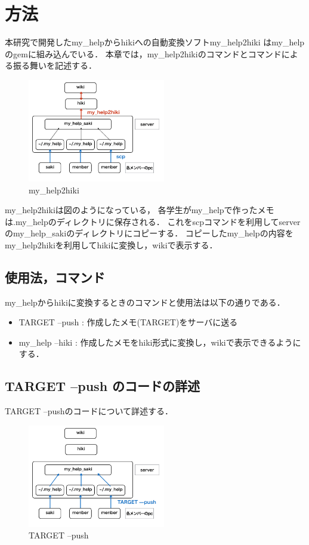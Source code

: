 \section{方法}
本研究で開発したmy\_helpからhikiへの自動変換ソフトmy\_help2hiki
はmy\_helpのgemに組み込んでいる．
本章では，my\_help2hikiのコマンドとコマンドによる振る舞いを記述する．

\begin{figure}[htbp]\begin{center}
\includegraphics[width=6cm,bb=100 100 600 700]{my_help2hiki_saki.010.png}
\caption{my\_help2hiki}
\label{default}\end{center}\end{figure}

my\_help2hikiは図のようになっている，
各学生がmy\_helpで作ったメモは.my\_helpのディレクトリに保存される．
これをscpコマンドを利用してserverのmy\_help\_sakiのディレクトリにコピーする．
コピーしたmy\_helpの内容をmy\_help2hikiを利用してhikiに変換し，wikiで表示する．

\subsection{使用法，コマンド}
my\_helpからhikiに変換するときのコマンドと使用法は以下の通りである．
\begin{itemize}
\item TARGET --push : 作成したメモ(TARGET)をサーバに送る
\end{itemize}  
\begin{itemize}
\item my\_help --hiki : 作成したメモをhiki形式に変換し，wikiで表示できるようにする．
\end{itemize}

\subsection{TARGET --push のコードの詳述}
TARGET --pushのコードについて詳述する．
\begin{figure}[htbp]\begin{center}
\includegraphics[width=6cm,bb=100 100 600 700]{my_help2hiki_saki.012.png}
\caption{TARGET --push}
\label{default}\end{center}\end{figure}

